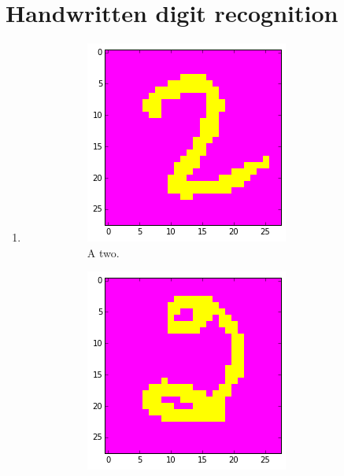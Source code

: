 \documentclass[a4paper,10pt]{article}
\numberwithin{equation}{section} %
\numberwithin{figure}{section} %
\numberwithin{table}{section} %
\theoremstyle{mytheor}
\begin{document}
\section{Handwritten digit recognition}
\begin{enumerate}
	\item \begin{figure}[h!]
			\centering
			\begin{subfigure}[b]{0.26\textwidth}
				\includegraphics[width=\textwidth]{digits/normaletwee.png}\vspace{-0.4cm}
				\caption{A two.}
			\end{subfigure}
			\begin{subfigure}[b]{0.26\textwidth}
				\includegraphics[width=\textwidth]{digits/cooletwee.png}\vspace{-0.4cm}

\end{subfigure}
\end{figure}
\end{enumerate}
\end{document}
